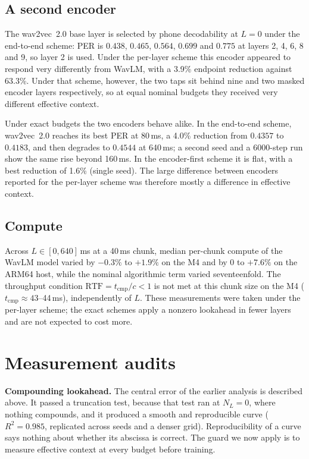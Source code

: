 \documentclass[journal]{IEEEtran}
\newcommand{\tcmp}{\ensuremath{t_{\mathrm{cmp}}}}
\begin{document}
\subsection{A second encoder}
\label{sec:encoder}

The wav2vec~2.0 base layer is selected by phone decodability at $L=0$ under
the end-to-end scheme: PER is $0.438$, $0.465$, $0.564$, $0.699$ and $0.775$
at layers 2, 4, 6, 8 and 9, so layer 2 is used. Under the per-layer scheme
this encoder appeared to respond very differently from WavLM, with a 3.9\%
endpoint reduction against 63.3\%. Under that scheme, however, the two taps
sit behind nine and two masked encoder layers respectively, so at equal
nominal budgets they received very different effective context.

Under exact budgets the two encoders behave alike. In the end-to-end scheme,
wav2vec~2.0 reaches its best PER at 80\,ms, a 4.0\% reduction from $0.4357$ to
$0.4183$, and then degrades to $0.4544$ at 640\,ms; a second seed and a
6000-step run show the same rise beyond 160\,ms. In the encoder-first scheme
it is flat, with a best reduction of 1.6\% (single seed). The large
difference between encoders reported for the per-layer scheme was therefore
mostly a difference in effective context.

\subsection{Compute}
\label{sec:compute}

Across $L\in[0,640]$\,ms at a 40\,ms chunk, median per-chunk compute of the
WavLM model varied by $-0.3\%$ to $+1.9\%$ on the M4 and by 0 to $+7.6\%$ on
the ARM64 host, while the nominal algorithmic term varied seventeenfold. The
throughput condition $\mathrm{RTF}=\tcmp/c<1$ is not met at this chunk size
on the M4 ($\tcmp\approx43$--44\,ms), independently of $L$. These
measurements were taken under the per-layer scheme; the exact schemes apply a
nonzero lookahead in fewer layers and are not expected to cost more.

\section{Measurement audits}
\label{sec:lessons}

\textbf{Compounding lookahead.} The central error of the earlier analysis is
described above. It passed a truncation test, because that test ran at
$N_L=0$, where nothing compounds, and it produced a smooth and reproducible
curve ($R^2=0.985$, replicated across seeds and a denser grid).
Reproducibility of a curve says nothing about whether its abscissa is
correct. The guard we now apply is to measure effective context at every
budget before training.
\end{document}
